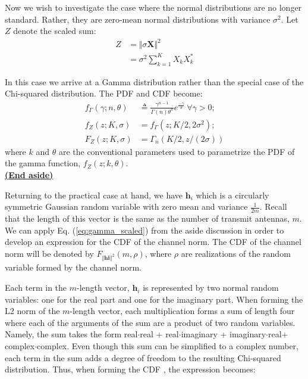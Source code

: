 Now we wish to investigate the case where the normal distributions are no longer standard. Rather, they are zero-mean normal distributions with variance $\sigma^2$. Let $Z$ denote the scaled sum:
\begin{equation}\label{eq:ch_sq_sum_scaled}
    \begin{aligned}
        Z &= \Vert \sigma \textbf{X} \Vert^2\\
          &= \sigma^2 \sum_{k = 1}^K X_kX_k^*
    \end{aligned}
\end{equation}

In this case we arrive at a Gamma distribution rather than the special case of the Chi-squared distribution. The PDF and CDF become:
\begin{equation}\label{eq:gamma_scaled}
    \begin{aligned}
        f_\Gamma(\gamma; n,\theta) &\triangleq \frac{\gamma^{n-1}}{\Gamma(n)\theta^n}e^{\frac{-\gamma}{\theta}} \ \forall \gamma > 0;\\
        f_Z(z; K, \sigma) &= f_\Gamma(z;K/2,2\sigma^2);\\
        F_Z(z;K,\sigma) &= \Gamma_n(K/2,z/(2\sigma))
    \end{aligned}
\end{equation}
where $k$ and $\theta$ are the conventional parameters used to parametrize the PDF of the gamma function, $f_Z(z;k,\theta)$.\\
\underline{\textbf{(End aside)}}

Returning to the practical case at hand, we have  $\textbf{h}_i$ which is a circularly symmetric Gaussian random variable with zero mean and variance  $\frac{1}{2m}$. Recall that the length of this vector is the same as the number of transmit antennas, $m$. We can apply Eq. (\ref{eq:gamma_scaled}) from the aside discussion in order to develop an expression for the CDF of the channel norm. The CDF of the channel norm will be denoted by $F_{\Vert\textbf{hi}\Vert^2}(m,\rho)$, where $\rho$ are realizations of the random variable formed by the channel norm. 

Each term in the $m$-length vector, $\textbf{h}_i$ is represented by two normal random variables: one for the real part and one for the imaginary part. When forming the L2 norm of the $m$-length vector, each multiplication forms a sum of length four where each of the arguments of the sum are a product of two random variables. Namely, the sum takes the form real$\cdot$real + real$\cdot$imaginary + imaginary$\cdot$real+ complex$\cdot$complex. Even though this sum can be simplified to a complex number, each term in the sum adds a degree of freedom to the resulting Chi-squared distribution. Thus, when forming the CDF , the expression becomes:

